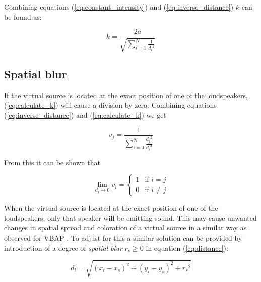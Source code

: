 \documentclass[twoside,10pt]{article}
\begin{document}

Combining equations (\ref{eq:constant_intensity}) and (\ref{eq:inverse_distance}) $k$ can be found as:

\begin{equation} \label{eq:calculate_k}
k = \frac{2a}{\sqrt{\sum_{i=1}^{N} \frac{1}{{d_{i}}^2}}}
\end{equation}




\subsection{Spatial blur}

If the virtual source is located at the exact position of one of the loudspeakers, (\ref{eq:calculate_k}) will cause a division by zero. Combining equations (\ref{eq:inverse_distance}) and (\ref{eq:calculate_k}) we get

\begin{equation}
v_{j} = \frac{1}{\sum_{i=0}^{N} \frac{{d_{j}}^2}{{d_{i}}^2}}
\end{equation}

From this it can be shown that

\begin{equation} \label{eq:distance_zero}
\lim_{d_{j} \rightarrow 0} v_{i} = 
\left\{ \begin{array}{ll} 
1 & \textrm{if $i=j$}\\ 
0 & \textrm{if $i \ne j$}
\end{array} \right.
\end{equation}

When the virtual source is located at the exact position of one of the loudspeakers, only that speaker will be emitting sound. This may cause unwanted changes in spatial spread and coloration of a virtual source in a similar way as observed for VBAP \cite{Pulkki:1999vbap}. To adjust for this a similar solution can be provided by introduction of a degree of \textit{spatial blur} $r_{s} \ge 0$ in equation (\ref{eq:distance}):

\begin{equation} \label{eq:mod_distance}
d_{i} = \sqrt{ {(x_{i} - x_{s})}^2 + {(y_{i} - y_{s})}^2 + {r_{s}}^2}
\end{equation}
\end{document}

